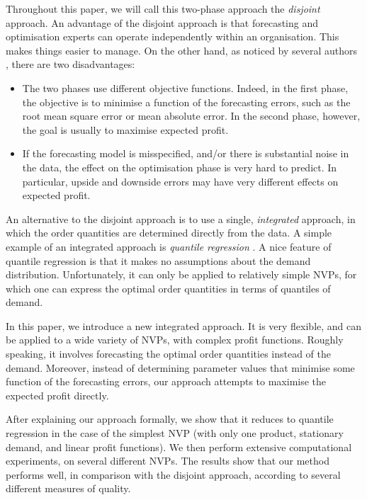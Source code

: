 \documentclass{article}
\begin{document}
Throughout this paper, we will call this two-phase approach the \emph{disjoint} approach. An advantage of the disjoint approach is that forecasting and optimisation experts can operate independently within an organisation. This makes things easier to manage. On the other hand, as noticed by several authors \cite{BT06,BM12,Ka94,KT96,KTB20}, there are two disadvantages:
\begin{itemize}
\item The two phases use different objective functions. Indeed, in the first phase, the objective is to minimise a function of the forecasting errors, such as the root mean square error or mean absolute error. In the second phase, however, the goal is usually to maximise expected profit.
\item If the forecasting model is misspecified, and/or there is substantial noise in the data, the effect on the optimisation phase is very hard to predict. In particular, upside and downside errors may have very different effects on expected profit.
\end{itemize}

An alternative to the disjoint approach is to use a single, \textit{integrated} approach, in which the order quantities are determined directly from the data. A simple example of an integrated approach is \emph{quantile regression} \cite{Br16,Hu19}. A nice feature of quantile regression is that it makes no assumptions about the demand distribution. Unfortunately, it can only be applied to relatively simple NVPs, for which one can express the optimal order quantities in terms of quantiles of demand.

In this paper, we introduce a new integrated approach. It is very flexible, and can be applied to a wide variety of NVPs, with complex profit functions. Roughly speaking, it involves forecasting the optimal order quantities instead of the demand. Moreover, instead of determining parameter values that minimise some function of the forecasting errors, our approach attempts to maximise the expected profit directly.

After explaining our approach formally, we show that it reduces to quantile regression in the case of the simplest NVP (with only one product, stationary demand, and linear profit functions).  We then perform extensive computational experiments, on several different NVPs. The results show that our method performs well, in comparison with the disjoint approach, according to several different measures of quality.
\end{document}
